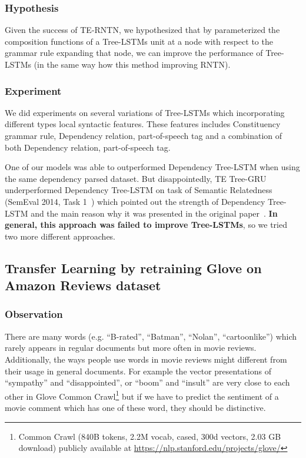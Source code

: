 \subsubsection{Hypothesis}
Given the success of TE-RNTN, we hypothesized that by parameterized the composition functions of a Tree-LSTMs unit at a node with respect to the grammar rule expanding that node, we can improve the performance of Tree-LSTMs (in the same way how this method improving RNTN).

\subsubsection{Experiment}
We did experiments on several variations of Tree-LSTMs which incorporating different types local syntactic features.
These features includes Constituency grammar rule, Dependency relation, part-of-speech tag and a combination of both Dependency relation, part-of-speech tag.

One of our models was able to outperformed Dependency Tree-LSTM when using the same dependency parsed dataset.
But disappointedly, TE Tree-GRU underperformed Dependency Tree-LSTM on task of Semantic Relatedness (SemEval 2014, Task 1~\cite{SemeEvalTask1}) which pointed out the strength of Dependency Tree-LSTM and the main reason why it was presented in the original paper~\cite{treeLSTM}.
\textbf{In general, this approach was failed to improve Tree-LSTMs}, so we tried two more different approaches.

\subsection{Transfer Learning by retraining Glove on Amazon Reviews dataset}
\subsubsection{Observation}
There are many words (e.g. ``B-rated'', ``Batman'', ``Nolan'', ``cartoonlike'') which rarely appears in regular documents but more often in movie reviews.
Additionally, the ways people use words in movie reviews might different from their usage in general documents.
For example the vector presentations of ``sympathy'' and ``disappointed'', or ``boom'' and ``insult'' are very close to each other in Glove Common Crawl\footnote{Common Crawl (840B tokens, 2.2M vocab, cased, 300d vectors, 2.03 GB download) publicly available at \url{https://nlp.stanford.edu/projects/glove/}} but if we have to predict the sentiment of a movie comment which has one of these word, they should be distinctive.

